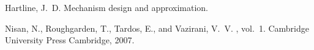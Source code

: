 \documentclass[12pt]{report}
\begin{document}
\begin{thebibliography}{1}

{\sc Hartline, J.~D.}
\newblock Mechanism design and approximation.

{\sc Nisan, N., Roughgarden, T., Tardos, E., and Vazirani, V.~V.}
, vol.~1.
\newblock Cambridge University Press Cambridge, 2007.

\end{thebibliography}
\end{document}
